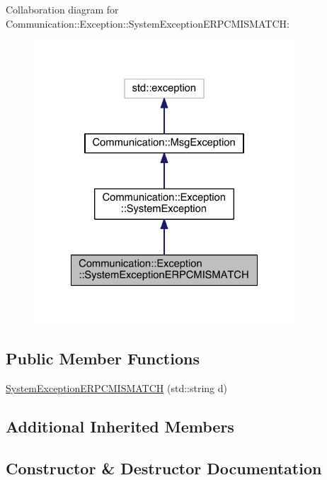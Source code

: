 Collaboration diagram for Communication\+:\+:Exception\+:\+:System\+Exception\+E\+R\+P\+C\+M\+I\+S\+M\+A\+T\+C\+H\+:\nopagebreak
\begin{figure}[H]
\begin{center}
\leavevmode
\includegraphics[width=276pt]{class_communication_1_1_exception_1_1_system_exception_e_r_p_c_m_i_s_m_a_t_c_h__coll__graph}
\end{center}
\end{figure}
\subsection*{Public Member Functions}
\begin{DoxyCompactItemize}
\item 
\hyperlink{class_communication_1_1_exception_1_1_system_exception_e_r_p_c_m_i_s_m_a_t_c_h_a61fc1381169f904f49491ef3e5616906}{System\+Exception\+E\+R\+P\+C\+M\+I\+S\+M\+A\+T\+C\+H} (std\+::string d)
\end{DoxyCompactItemize}
\subsection*{Additional Inherited Members}


\subsection{Constructor \& Destructor Documentation}
\hypertarget{class_communication_1_1_exception_1_1_system_exception_e_r_p_c_m_i_s_m_a_t_c_h_a61fc1381169f904f49491ef3e5616906}{}
